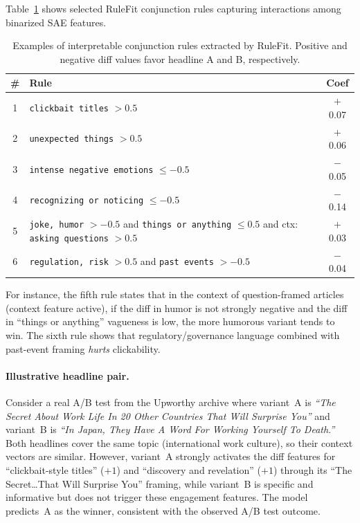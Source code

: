 \documentclass[sigconf,natbib=false, language=english]{acmart}
\begin{document}
Table~\ref{tab:rules} shows selected RuleFit conjunction rules capturing interactions among binarized SAE features.

\begin{table}[t]
\centering
\caption{Examples of interpretable conjunction rules extracted by RuleFit. Positive and negative diff values favor headline A and B, respectively.}
\label{tab:rules}
\small
\begin{tabular}{@{}c p{} c@{}}
\toprule
\# & Rule & Coef \\
\midrule
1 & \texttt{clickbait titles} $> 0.5$ & $+$0.07 \\
2 & \texttt{unexpected things} $> 0.5$ & $+$0.06 \\
3 & \texttt{intense negative emotions} $\leq -0.5$ & $-$0.05 \\
4 & \texttt{recognizing or noticing} $\leq -0.5$ & $-$0.14 \\
5 & \texttt{joke, humor} $> {-}0.5$ and \texttt{things or anything} $\leq 0.5$ and ctx: \texttt{asking questions} $> 0.5$ & $+$0.03 \\
6 & \texttt{regulation, risk} $> 0.5$ and \texttt{past events} $> {-}0.5$ & $-$0.04 \\
\bottomrule
\end{tabular}
\end{table}

For instance, the fifth rule states that in the context of question-framed articles (context feature active), if the diff in humor is not strongly negative and the diff in ``things or anything'' vagueness is low, the more humorous variant tends to win. The sixth rule shows that regulatory/governance language combined with past-event framing \emph{hurts} clickability.

\paragraph{Illustrative headline pair.}
Consider a real A/B test from the Upworthy archive where variant~A is \emph{``The Secret About Work Life In 20 Other Countries That Will Surprise You''} and variant~B is \emph{``In Japan, They Have A Word For Working Yourself To Death.''}
Both headlines cover the same topic (international work culture), so their context vectors are similar. However, variant~A strongly activates the diff features for ``clickbait-style titles'' ($+1$) and ``discovery and revelation'' ($+1$) through its ``The Secret\ldots That Will Surprise You'' framing, while variant~B is specific and informative but does not trigger these engagement features. The model predicts~A as the winner, consistent with the observed A/B test outcome.
\end{document}
